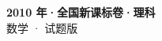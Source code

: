 \documentclass[zihao=-4, a4paper]{ctexart}
\begin{document}
\begin{center}
  {\Large\bfseries 2010 年·全国新课标卷·理科}\\[4pt]
  {\large 数学 · 试题版}
\end{center}
\medskip
{}

\end{document}
